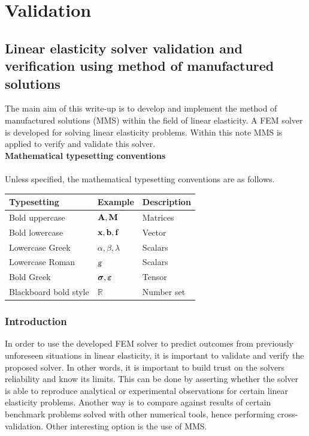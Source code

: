 \chapter{Validation}

\section{Linear elasticity solver validation and verification using method of manufactured solutions}
The main aim of this write-up is to develop and implement the method of manufactured solutions (MMS) within the field of linear elasticity. A FEM solver is developed for solving linear elasticity problems. Within this note MMS is applied to verify and validate this solver.\\

	\noindent\textbf{Mathematical typesetting conventions}\\\\
	\noindent Unless specified, the mathematical typesetting conventions are as follows.\\
	\begin{table}[h]
		\centering
			\begin{tabular}{p{}p{}p{} }
			\hline
			Typesetting &Example&Description\\
			\hline
			Bold uppercase & ${{\textbf{A}}},{\textbf M}$& Matrices\\
			Bold lowercase & ${\textbf{x}},{\textbf{b}},\textbf{f}$& Vector\\
			Lowercase Greek   & $\alpha,\beta,\lambda$ & Scalars\\
			Lowercase Roman   & $\textsl{g}$ & Scalars\\			
			Bold Greek   & $\boldsymbol{\sigma},\boldsymbol{\varepsilon}$ & Tensor\\
			Blackboard bold style   & $\mathbb{R}$ & Number set\\												
			\hline
		\end{tabular}
	\end{table}
	

\subsection{Introduction}
	
In order to use the developed FEM solver to predict outcomes from previously unforeseen situations in linear elasticity, it is important to validate and verify the proposed solver. In other words, it is important to build trust on the solvers reliability and know its limits. This can be done by asserting whether the solver is able to reproduce analytical or experimental observations for certain linear elasticity problems. Another way is to compare against results of certain benchmark problems solved with other numerical tools, hence performing cross-validation. Other interesting option is the use of MMS. 


